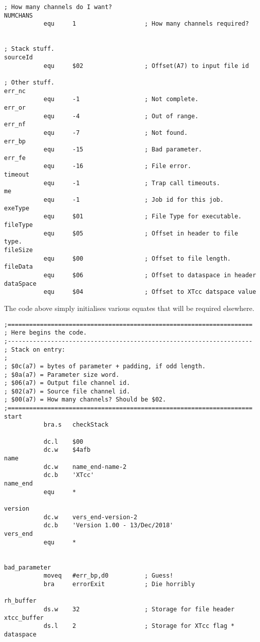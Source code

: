 \begin{lstlisting}[firstnumber=last,caption={XTcc - Equates}]
; How many channels do I want?
NUMCHANS
           equ     1                   ; How many channels required?


; Stack stuff.
sourceId
           equ     $02                 ; Offset(A7) to input file id

; Other stuff.
err_nc
           equ     -1                  ; Not complete.
err_or
           equ     -4                  ; Out of range.
err_nf
           equ     -7                  ; Not found.
err_bp
           equ     -15                 ; Bad parameter.
err_fe
           equ     -16                 ; File error.
timeout
           equ     -1                  ; Trap call timeouts.
me
           equ     -1                  ; Job id for this job.
exeType
           equ     $01                 ; File Type for executable.
fileType
           equ     $05                 ; Offset in header to file type.
fileSize
           equ     $00                 ; Offset to file length.
fileData
           equ     $06                 ; Offset to dataspace in header
dataSpace
           equ     $04                 ; Offset to XTcc datspace value
\end{lstlisting}

The code above simply initialises various equates that will be required elsewhere.


\begin{lstlisting}[firstnumber=last,caption={XTcc - Initialisation}]
;====================================================================
; Here begins the code.
;--------------------------------------------------------------------
; Stack on entry:
;
; $0c(a7) = bytes of parameter + padding, if odd length.
; $0a(a7) = Parameter size word.
; $06(a7) = Output file channel id.
; $02(a7) = Source file channel id.
; $00(a7) = How many channels? Should be $02.
;====================================================================
start
           bra.s   checkStack

           dc.l    $00
           dc.w    $4afb
name
           dc.w    name_end-name-2
           dc.b    'XTcc'
name_end
           equ     *

version
           dc.w    vers_end-version-2
           dc.b    'Version 1.00 - 13/Dec/2018'
vers_end
           equ     *


bad_parameter
           moveq   #err_bp,d0          ; Guess!
           bra     errorExit           ; Die horribly

rh_buffer
           ds.w    32                  ; Storage for file header
xtcc_buffer
           ds.l    2                   ; Storage for XTcc flag * dataspace
\end{lstlisting}

